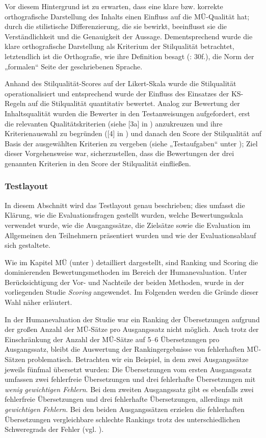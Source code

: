 Vor diesem Hintergrund ist zu erwarten, dass eine klare bzw. korrekte orthografische Darstellung des Inhalts einen Einfluss auf die MÜ-Qualität hat; durch die stilistische Differenzierung, die sie bewirkt, beeinflusst sie die Verständlichkeit und die Genauigkeit der Aussage. Dementsprechend wurde die klare orthografische Darstellung als Kriterium der Stilqualität betrachtet, letztendlich ist die Orthografie, wie ihre Definition besagt (\citealt{Nerius2007}: 30f.), die Norm der „formalen“ Seite der geschriebenen Sprache.

Anhand des Stilqualität-Scores auf der Likert-Skala wurde die Stilqualität operationalisiert und entsprechend wurde der Einfluss des Einsatzes der KS-Regeln auf die Stilqualität quantitativ bewertet. Analog zur Bewertung der Inhaltsqualität wurden die Bewerter in den Testanweisungen aufgefordert, erst die relevanten Qualitätskriterien (siehe [3a] in ) anzukreuzen und ihre Kriterienauswahl zu begründen ([4] in ) und danach den Score der Stilqualität auf Basis der ausgewählten Kriterien zu vergeben (siehe „Testaufgaben“ unter ); Ziel dieser Vorgehensweise war, sicherzustellen, dass die Bewertungen der drei genannten Kriterien in den Score der Stilqualität einfließen.


\subsubsection{\label{sec:4.4.5.2}Testlayout}

In diesem Abschnitt wird das Testlayout genau beschrieben; dies umfasst die Klärung, wie die Evaluationsfragen gestellt wurden, welche Bewertungsskala verwendet wurde, wie die Ausgangssätze, die Zielsätze sowie die Evaluation im Allgemeinen den Teilnehmern präsentiert wurden und wie der Evaluationsablauf sich gestaltete.


Wie im Kapitel MÜ (unter ) detailliert dargestellt, sind Ranking und Sco\-ring die dominierenden Bewertungsmethoden im Bereich der Humanevaluation. Unter Berücksichtigung der Vor- und Nachteile der beiden Methoden, wurde in der vorliegenden Studie \textit{Scoring} angewendet. Im Folgenden werden die Gründe dieser Wahl näher erläutert.

In der Humanevaluation der Studie war ein Ranking der Übersetzungen aufgrund der großen Anzahl der MÜ-Sätze pro Ausgangssatz nicht möglich. Auch trotz der Einschränkung der Anzahl der MÜ-Sätze auf 5--6 Übersetzungen pro Ausgangssatz, bleibt die Auswertung der Rankingergebnisse von fehlerhaften MÜ-Sätzen problematisch. Betrachten wir ein Beispiel, in dem zwei Ausgangssätze jeweils fünfmal übersetzt wurden: Die Übersetzungen vom ersten Ausgangssatz umfassen zwei fehlerfreie Übersetzungen und drei fehlerhafte Übersetzungen mit \textit{wenig gewichtigen Fehlern}. Bei dem zweiten Ausgangssatz gibt es ebenfalls zwei fehlerfreie Übersetzungen und drei fehlerhafte Übersetzungen, allerdings mit \textit{gewichtigen Fehlern}. Bei den beiden Ausgangssätzen erzielen die fehlerhaften Übersetzungen vergleichbare schlechte Rankings trotz des unterschiedlichen Schweregrads der Fehler (vgl. \citealt{CostaEtAl2015}).

